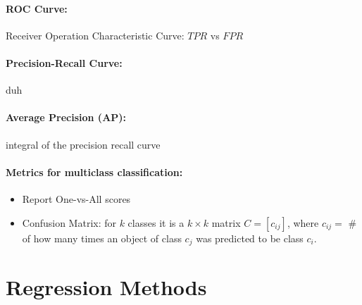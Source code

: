 \documentclass{article}
\begin{document}
\paragraph{ROC Curve:} Receiver Operation Characteristic Curve: $TPR$ vs $FPR$
\paragraph{Precision-Recall Curve:} duh
\paragraph{Average Precision (AP):} integral of the precision recall curve
\paragraph{Metrics for multiclass classification:}
\begin{itemize}
\item Report One-vs-All scores
\item Confusion Matrix: for $k$ classes it is a $k \times k$ matrix $C =
  [c_{ij}]$, where $c_{ij} = $ \# of how many times an object of class $c_j$ was
  predicted to be class $c_i$. 
\end{itemize}
\section{Regression Methods}
\end{document}
